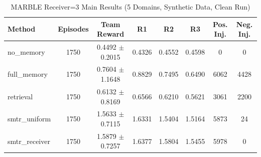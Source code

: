 \begin{table}[t]
\caption{MARBLE Receiver=3 Main Results (5 Domains, Synthetic Data, Clean Run)}
\label{tab:final_receiver3_main}
\centering
\begin{tabular}{l c c c c c c c}
\toprule
Method & Episodes & Team Reward & R1 & R2 & R3 & Pos. Inj. & Neg. Inj. \\
\midrule
no\_memory & 1750 & 0.4492 $\pm$ 0.2015 & 0.4326 & 0.4552 & 0.4598 & 0 & 0 \\
full\_memory & 1750 & 0.7604 $\pm$ 1.1648 & 0.8829 & 0.7495 & 0.6490 & 6062 & 4428 \\
retrieval & 1750 & 0.6132 $\pm$ 0.8169 & 0.6566 & 0.6210 & 0.5621 & 3061 & 2200 \\
smtr\_uniform & 1750 & 1.5633 $\pm$ 0.7115 & 1.6331 & 1.5404 & 1.5164 & 5873 & 24 \\
smtr\_receiver & 1750 & 1.5879 $\pm$ 0.7257 & 1.6377 & 1.5804 & 1.5455 & 5978 & 0 \\
\bottomrule
\end{tabular}
\end{table}
